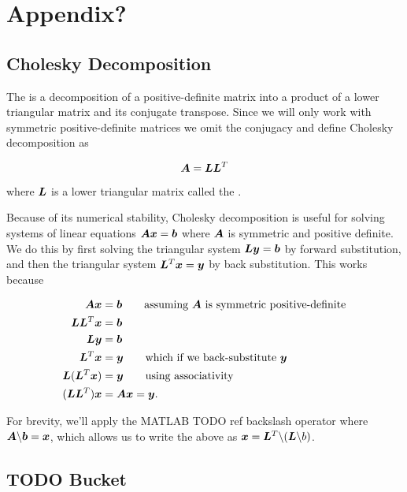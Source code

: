 \chapter{Appendix?}

\section{Cholesky Decomposition}

\begin{defn}
  The  is a decomposition of a
  positive-definite matrix into a product of a lower triangular matrix and
  its conjugate transpose. Since we will only work with symmetric
  positive-definite matrices we omit the conjugacy and define Cholesky
  decomposition as

  \begin{equation}
    {\bm{A}} = {\bm{L}} {\bm{L}}^T
  \end{equation}

  where ${\bm{L}}$ is a lower triangular matrix called the .
\end{defn}

Because of its numerical stability, Cholesky decomposition is useful for
solving systems of linear equations ${\bm{A}} {\bm{x}} = {\bm{b}}$ where ${\bm{A}}$ is symmetric
and positive definite. We do this by first solving the triangular system ${\bm{L}}
{\bm{y}} = {\bm{b}}$ by forward substitution, and then the triangular system ${\bm{L}}^T {\bm{x}} =
{\bm{y}}$ by back substitution. This works because

\begin{align}
  {\bm{A}} {\bm{x}} &= {\bm{b}} \qquad \text{assuming ${\bm{A}}$ is symmetric positive-definite} \\
  {\bm{L}}{\bm{L}}^T {\bm{x}} &= {\bm{b}} \\
  {\bm{L}} {\bm{y}} &= {\bm{b}} \\
  {\bm{L}}^T {\bm{x}} &= {\bm{y}} \qquad \text{which if we back-substitute ${\bm{y}}$} \\
  {\bm{L}} ({\bm{L}}^T {\bm{x}}) &= {\bm{y}} \qquad \text{using associativity} \\
  ({\bm{L}} {\bm{L}}^T) {\bm{x}} &= {\bm{A}} {\bm{x}} = {\bm{y}}.
\end{align}

For brevity, we'll apply the MATLAB {TODO ref} backslash operator where ${\bm{A}}
\backslash {\bm{b}} = {\bm{x}}$, which allows us to write the above as ${\bm{x}} = {\bm{L}}^T
\backslash ({\bm{L}} \backslash b)$.


\section{TODO Bucket}

